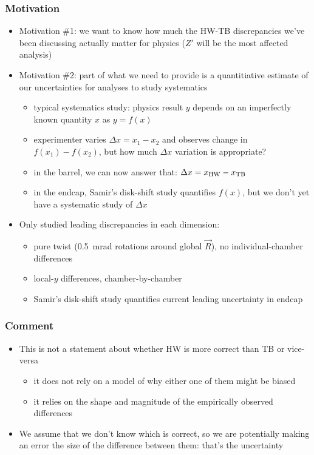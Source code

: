 \documentclass[compress]{beamer}
\newcommand{\s}[1]{{\mbox{\scriptsize #1}}}
\begin{document}
\begin{frame}
\frametitle{Motivation}
\begin{itemize}
\item Motivation \#1: we want to know how much the HW-TB discrepancies we've been discussing actually matter for physics ($Z'$ will be the most affected analysis)
\item Motivation \#2: part of what we need to provide is a quantitiative estimate of our uncertainties for analyses to study systematics
\begin{itemize}
\item typical systematics study: physics result $y$ depends on an imperfectly known quantity $x$ as $y = f(x)$
\item experimenter varies $\Delta x = x_1 - x_2$ and observes change in $f(x_1) - f(x_2)$, but how much $\Delta x$ variation is appropriate?
\item in the barrel, we can now answer that: \mbox{$\Delta x = x_\s{HW} - x_\s{TB}$\hspace{-1 cm}}
\item in the endcap, Samir's disk-shift study quantifies $f(x)$, but we don't yet have a systematic study of $\Delta x$
\end{itemize}
\item Only studied leading discrepancies in each dimension:
\begin{itemize}
\item pure twist (0.5~mrad rotations around global $\vec{R}$), no individual-chamber differences
\item local-$y$ differences, chamber-by-chamber
\item Samir's disk-shift study quantifies current leading uncertainty in endcap
\end{itemize}
\end{itemize}
\end{frame}

\begin{frame}
\frametitle{Comment}
\begin{itemize}
\item This is not a statement about whether HW is more correct than TB or vice-versa
\begin{itemize}
\item it does not rely on a model of why either one of them might be biased
\item it relies on the shape and magnitude of the empirically observed differences
\end{itemize}
\item We assume that we don't know which is correct, so we are
potentially making an error the size of the difference between them: that's the uncertainty
\end{itemize}
\end{frame}
\end{document}

